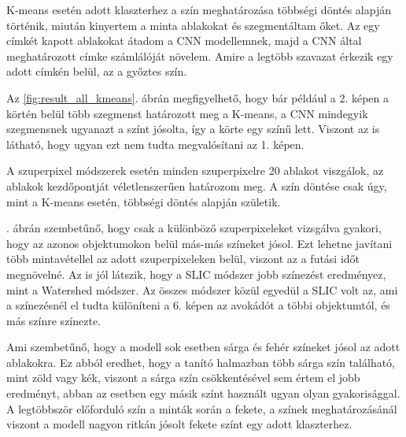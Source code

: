K-means esetén adott klaszterhez a szín meghatározása többségi döntés alapján történik, miután kinyertem a minta ablakokat és szegmentáltam őket. Az egy címkét kapott ablakokat átadom a CNN modellemnek, majd a CNN által meghatározott címke számlálóját növelem. Amire a legtöbb szavazat érkezik egy adott címkén belül, az a győztes szín.

Az \ref{fig:result_all_kmeans}. ábrán megfigyelhető, hogy bár például a 2. képen a körtén belül több szegmenst határozott meg a K-means, a CNN mindegyik szegmensnek ugyanazt a színt jósolta, így a körte egy színű lett. Viszont az is látható, hogy ugyan ezt nem tudta megvalósítani az 1. képen.

A szuperpixel módszerek esetén minden szuperpixelre 20 ablakot viszgálok, az ablakok kezdőpontját véletlenszerűen határozom meg. A szín döntése csak úgy, mint a K-means esetén, többségi döntés alapján születik. 

. ábrán szembetűnő, hogy csak a különböző szuperpixeleket vizsgálva gyakori, hogy az azonos objektumokon belül más-más színeket jósol. Ezt lehetne javítani több mintavétellel az adott szuperpixeleken belül, viszont az a futási időt megnövelné. Az is jól látszik, hogy a SLIC módszer jobb színezést eredményez, mint a Watershed módszer. Az összes módszer közül egyedül a SLIC volt az, ami a színezésnél el tudta különíteni a 6. képen az avokádót a többi objektumtól, és más színre színezte.

Ami szembetűnő, hogy a modell sok esetben sárga és fehér színeket jósol az adott ablakokra. Ez abból eredhet, hogy a tanító halmazban több sárga szín található, mint zöld vagy kék, viszont a sárga szín csökkentésével sem értem el jobb eredményt, abban az esetben egy másik színt használt ugyan olyan gyakorisággal. A legtöbbször előforduló szín a minták során a fekete, a színek meghatározásánál viszont a modell nagyon ritkán jósolt fekete színt egy adott klaszterhez. 

